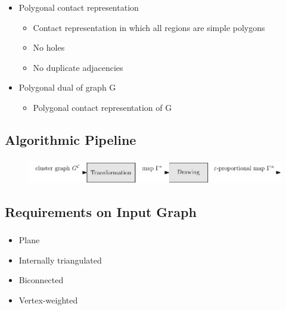\documentclass[t,18pt]{beamer}
\begin{document}
\begin{frame}
  \frametitle{}
  \begin{itemize}
    \item Polygonal contact representation \begin{itemize}
      \item Contact representation in which all regions are simple polygons
      \item No holes
      \item No duplicate adjacencies
    \end{itemize}
    \item Polygonal dual of graph G \begin{itemize}
      \item Polygonal contact representation of G
    \end{itemize}
  \end{itemize}
\end{frame}

\subsection{Algorithmic Pipeline}
\label{subsect:algorithmic-pipeline-static}

\begin{frame}[c]
  \frametitle{}
  \begin{figure}
    \includegraphics[width=\textwidth]{../Thesis/Resources/Framework-1.pdf}
  \end{figure}
\end{frame}

\subsection{Requirements on Input Graph}
\label{subsect:requirements-on-input-graph}

\begin{frame}
  \frametitle{}
  \begin{itemize}
    \item Plane
    \item Internally triangulated
    \item Biconnected
    \item Vertex-weighted
  \end{itemize}
\end{frame}
\end{document}
